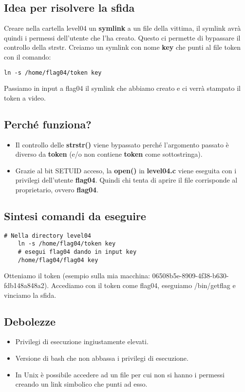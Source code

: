 \subsection{Idea per risolvere la sfida}
Creare nella cartella level04 un \textbf{symlink} a un file della vittima, il symlink avrà quindi i permessi dell'utente che l'ha creato. Questo ci permette di bypassare il controllo della strstr.
Creiamo un symlink con nome \textbf{key} che punti al file token con il comando:
\begin{lstlisting}[style=bashstyle]
    ln -s /home/flag04/token key
\end{lstlisting}
Passiamo in input a flag04 il symlink che abbiamo creato e ci verrà stampato il token a video.
\subsection{Perché funziona?}
\begin{itemize}
    \item Il controllo delle \textbf{strstr()} viene bypassato perché l’argomento passato è diverso da \textbf{token} (e/o non contiene \textbf{token} come sottostringa).
    \item Grazie al bit SETUID acceso, la \textbf{open()} in \textbf{level04.c} viene eseguita con i privilegi dell’utente \textbf{flag04}. Quindi chi tenta di aprire il file corrisponde al proprietario, ovvero \textbf{flag04}.
\end{itemize}

\subsection{Sintesi comandi da eseguire}
\begin{lstlisting}[style=bashstyle]
    # Nella directory level04
    ln -s /home/flag04/token key
    # esegui flag04 dando in input key
    /home/flag04/flag04 key
\end{lstlisting}
Otteniamo il token (esempio sulla mia macchina: 06508b5e-8909-4f38-b630-fdb148a848a2).
Accediamo con il token come ﬂag04, eseguiamo /bin/getﬂag e vinciamo la sfida.

\subsection{Debolezze}
\begin{itemize}
    \item Privilegi di esecuzione ingiustamente elevati.
    \item Versione di bash che non abbassa i privilegi di esecuzione.
    \item In Unix è possibile accedere ad un file per cui non si hanno i permessi creando un link simbolico che punti ad esso.
\end{itemize}

